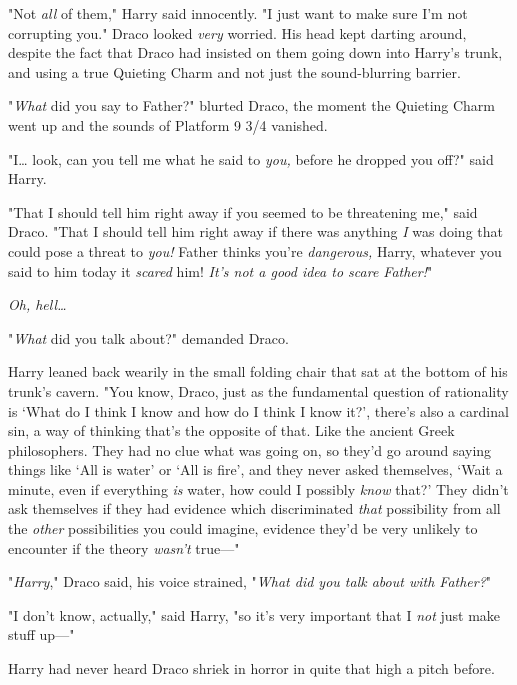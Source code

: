 "Not \emph{all} of them," Harry said innocently. "I just want to make sure I'm 
not corrupting you."
\sbreak
Draco looked \emph{very} worried. His head kept darting around, despite the 
fact that Draco had insisted on them going down into Harry's trunk, and using a 
true Quieting Charm and not just the sound-blurring barrier.

"\emph{What} did you say to Father?" blurted Draco, the moment the Quieting 
Charm went up and the sounds of Platform 9 3/4 vanished.

"I{\ldots} look, can you tell me what he said to \emph{you,} before he dropped 
you off?" said Harry.

"That I should tell him right away if you seemed to be threatening me," said 
Draco. "That I should tell him right away if there was anything \emph{I} was 
doing that could pose a threat to \emph{you!} Father thinks you're 
\emph{dangerous,} Harry, whatever you said to him today it \emph{scared} him! 
\emph{It's not a good idea to scare Father!}"

\emph{Oh, hell{\ldots}}

"\emph{What} did you talk about?" demanded Draco.

Harry leaned back wearily in the small folding chair that sat at the bottom of 
his trunk's cavern. "You know, Draco, just as the fundamental question of 
rationality is `What do I think I know and how do I think I know it?', there's 
also a cardinal sin, a way of thinking that's the opposite of that. Like the 
ancient Greek philosophers. They had no clue what was going on, so they'd go 
around saying things like `All is water' or `All is fire', and they never asked 
themselves, `Wait a minute, even if everything \emph{is} water, how could I 
possibly \emph{know} that?' They didn't ask themselves if they had evidence 
which discriminated \emph{that} possibility from all the \emph{other} 
possibilities you could imagine, evidence they'd be very unlikely to encounter 
if the theory \emph{wasn't} true---"

"\emph{Harry}," Draco said, his voice strained, "\emph{What did you talk about 
with Father?}"

"I don't know, actually," said Harry, "so it's very important that I \emph{not} 
just make stuff up---"

Harry had never heard Draco shriek in horror in quite that high a pitch before.
